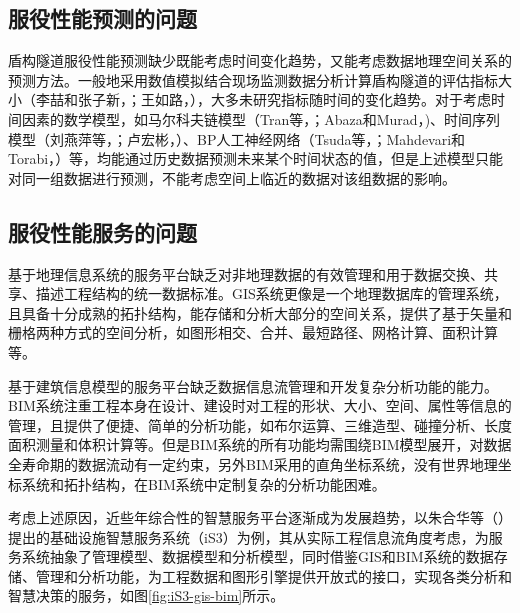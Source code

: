\subsection{服役性能预测的问题}

盾构隧道服役性能预测缺少既能考虑时间变化趋势，又能考虑数据地理空间关系的预测方法。一般地采用数值模拟结合现场监测数据分析计算盾构隧道的评估指标大小（李喆和张子新，\citeyear{李喆2005相邻隧道施工对上海地铁二号线的影响分析}；王如路，\citeyear{王如路2009上海软土地铁隧道变形影响因素及变形特征分析}），大多未研究指标随时间的变化趋势。对于考虑时间因素的数学模型，如马尔科夫链模型（Tran等，\citeyear{tran2008prediction}；Abaza和Murad，\citeyear{abaza2009predicting})、时间序列模型（刘燕萍等，\citeyear{刘燕萍2010时间序列分析在建筑物变形监测中的应用}；卢宏彬，\citeyear{卢宏彬2016基于时间序列的结构损伤概率方法研究}）、BP人工神经网络（Tsuda等，\citeyear{tsuda2006estimating}；Mahdevari和Torabi，\citeyear{mahdevari2012prediction}）等，均能通过历史数据预测未来某个时间状态的值，但是上述模型只能对同一组数据进行预测，不能考虑空间上临近的数据对该组数据的影响。

\subsection{服役性能服务的问题}

基于地理信息系统的服务平台缺乏对非地理数据的有效管理和用于数据交换、共享、描述工程结构的统一数据标准。GIS系统更像是一个地理数据库的管理系统，且具备十分成熟的拓扑结构，能存储和分析大部分的空间关系，提供了基于矢量和栅格两种方式的空间分析，如图形相交、合并、最短路径、网格计算、面积计算等。

基于建筑信息模型的服务平台缺乏数据信息流管理和开发复杂分析功能的能力。BIM系统注重工程本身在设计、建设时对工程的形状、大小、空间、属性等信息的管理，且提供了便捷、简单的分析功能，如布尔运算、三维造型、碰撞分析、长度面积测量和体积计算等。但是BIM系统的所有功能均需围绕BIM模型展开，对数据全寿命期的数据流动有一定约束，另外BIM采用的直角坐标系统，没有世界地理坐标系统和拓扑结构，在BIM系统中定制复杂的分析功能困难。

考虑上述原因，近些年综合性的智慧服务平台逐渐成为发展趋势，以朱合华等（\citeyear{朱合华2018智慧基础设施}）提出的基础设施智慧服务系统（iS3）为例，其从实际工程信息流角度考虑，为服务系统抽象了管理模型、数据模型和分析模型，同时借鉴GIS和BIM系统的数据存储、管理和分析功能，为工程数据和图形引擎提供开放式的接口，实现各类分析和智慧决策的服务，如图\ref{fig:iS3-gis-bim}所示。

